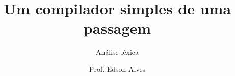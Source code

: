 \title{Um compilador simples de uma passagem}
\subtitle{Análise léxica}
\date{}
\author{Prof. Edson Alves}
